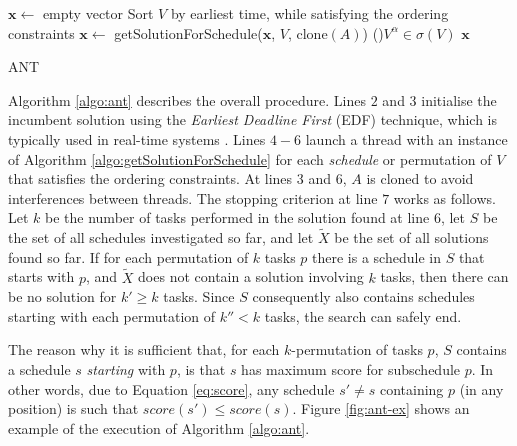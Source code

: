 \begin{algorithm}[t]
    \DontPrintSemicolon
    $\bm{x} \gets$ empty vector\;
    Sort $V$ by earliest time, while satisfying the ordering constraints
    $\bm{x} \gets$ \textsf{getSolutionForSchedule($\bm{x}$, $V$, $\text{clone}(A)$)}
    \For(){$V^\alpha \in \sigma(V)$}{
    }
    \Return $\bm{x}$\;
    \caption{ANT\label{algo:ant}}
\end{algorithm}

Algorithm \ref{algo:ant} describes the overall procedure. Lines $2$ and $3$ initialise the
incumbent solution using the \emph{Earliest Deadline First} (EDF) technique, which is
typically used in real-time systems \cite{stankovic2013edf}. Lines $4 - 6$ launch a thread
with an instance of Algorithm \ref{algo:getSolutionForSchedule} for each \emph{schedule}
or permutation of $V$ that satisfies the ordering constraints. At lines $3$ and $6$, $A$
is cloned to avoid interferences between threads. The stopping criterion at line $7$ works
as follows. Let $k$ be the number of tasks performed in the solution found at line $6$,
let $S$ be the set of all schedules investigated so far, and let $\tilde{X}$ be the set of
all solutions found so far. If for each permutation of $k$ tasks $p$ there is a schedule
in $S$ that starts with $p$, and $\tilde{X}$ does not contain a solution involving $k$
tasks, then there can be no solution for $k' \geq k$ tasks. Since $S$ consequently also
contains schedules starting with each permutation of $k'' < k$ tasks, the search can
safely end.

The reason why it is sufficient that, for each $k$-permutation of tasks $p$, $S$ contains
a schedule $s$ \emph{starting} with $p$, is that $s$ has maximum score for subschedule $p$.
In other words, due to Equation \ref{eq:score}, any schedule $s' \neq s$ containing $p$
(in any position) is such that $score(s') \leq score(s)$. Figure \ref{fig:ant-ex}
shows an example of the execution of Algorithm \ref{algo:ant}.

